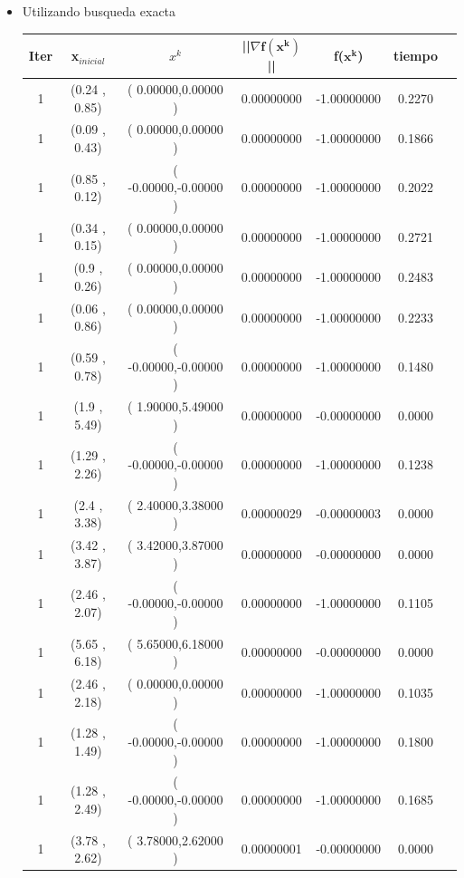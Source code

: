 \begin{itemize}

\item Utilizando busqueda exacta

\begin{table}[H]
\centering
\renewcommand{\arraystretch}{1.2} %
\begin{tabular}{|c|c|c|c|c|c|c|}
\hline
\textbf{Iter} & \textbf{x$_{inicial}$}& \textbf{$x^k$} & \textbf{||$\nabla \mathbf{f(x^k)}$}|| & \textbf{f($\mathbf{x^k}$)}& \textbf{tiempo} \\
\hline
1  & (0.24 , 0.85) &( 0.00000,0.00000 ) & 0.00000000 & -1.00000000 & 0.2270 \\
1  & (0.09 , 0.43) &( 0.00000,0.00000 ) & 0.00000000 & -1.00000000 & 0.1866 \\
1  & (0.85 , 0.12) &( -0.00000,-0.00000 ) & 0.00000000 & -1.00000000 & 0.2022 \\
1  & (0.34 , 0.15) &( 0.00000,0.00000 ) & 0.00000000 & -1.00000000 & 0.2721 \\
1  & (0.9 , 0.26) &( 0.00000,0.00000 ) & 0.00000000 & -1.00000000 & 0.2483 \\
1  & (0.06 , 0.86) &( 0.00000,0.00000 ) & 0.00000000 & -1.00000000 & 0.2233 \\
1  & (0.59 , 0.78) &( -0.00000,-0.00000 ) & 0.00000000 & -1.00000000 & 0.1480 \\
1  & (1.9 , 5.49) &( 1.90000,5.49000 ) & 0.00000000 & -0.00000000 & 0.0000 \\
1  & (1.29 , 2.26) &( -0.00000,-0.00000 ) & 0.00000000 & -1.00000000 & 0.1238 \\
1  & (2.4 , 3.38) &( 2.40000,3.38000 ) & 0.00000029 & -0.00000003 & 0.0000 \\
1  & (3.42 , 3.87) &( 3.42000,3.87000 ) & 0.00000000 & -0.00000000 & 0.0000 \\
1  & (2.46 , 2.07) &( -0.00000,-0.00000 ) & 0.00000000 & -1.00000000 & 0.1105 \\
1  & (5.65 , 6.18) &( 5.65000,6.18000 ) & 0.00000000 & -0.00000000 & 0.0000 \\
1  & (2.46 , 2.18) &( 0.00000,0.00000 ) & 0.00000000 & -1.00000000 & 0.1035 \\
1  & (1.28 , 1.49) &( -0.00000,-0.00000 ) & 0.00000000 & -1.00000000 & 0.1800 \\
1  & (1.28 , 2.49) &( -0.00000,-0.00000 ) & 0.00000000 & -1.00000000 & 0.1685 \\
1  & (3.78 , 2.62) &( 3.78000,2.62000 ) & 0.00000001 & -0.00000000 & 0.0000 \\
\hline
\end{tabular}
\end{table}


\end{itemize}
